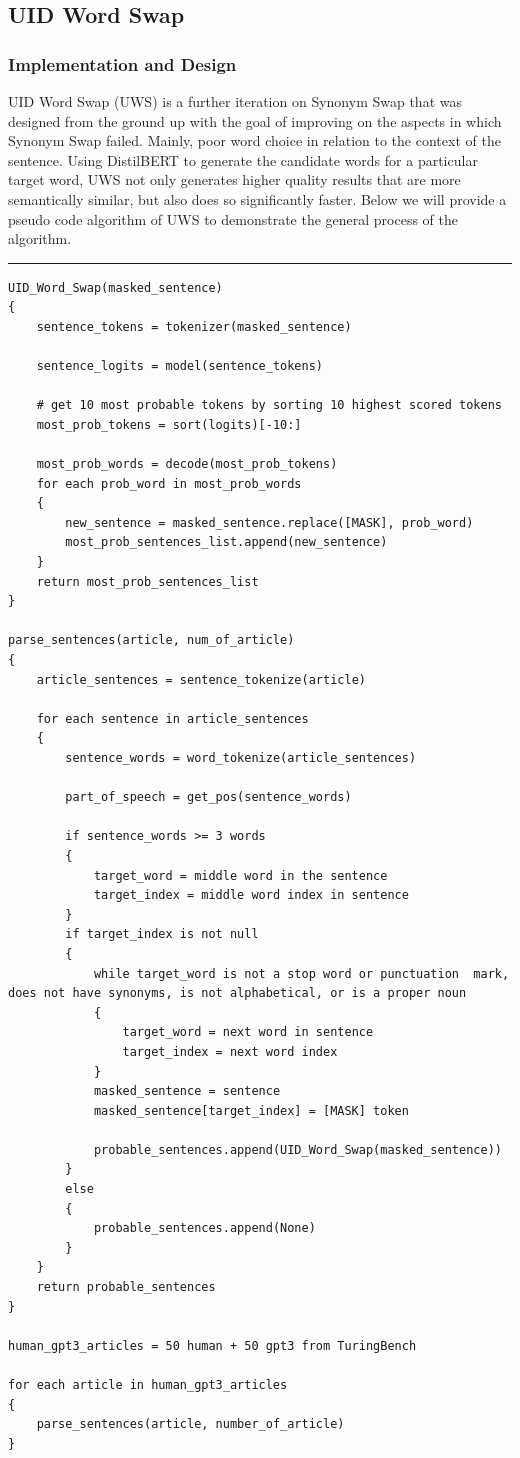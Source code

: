 \documentclass{article}
\begin{document}
\subsection{UID Word Swap}
\subsubsection{Implementation and Design}
UID Word Swap (UWS) is a further iteration on Synonym Swap that was designed from the ground up with the goal of improving on the aspects in which Synonym Swap failed. Mainly, poor word choice in relation to the context of the sentence. Using DistilBERT to generate the candidate words for a particular target word, UWS not only generates higher quality results that are more semantically similar, but also does so significantly faster. Below we will provide a pseudo code algorithm of UWS to demonstrate the general process of the algorithm.
\newline
\noindent\rule{12cm}{0.4pt}
\begin{verbatim}
UID_Word_Swap(masked_sentence)
{
    sentence_tokens = tokenizer(masked_sentence)

    sentence_logits = model(sentence_tokens)

    # get 10 most probable tokens by sorting 10 highest scored tokens
    most_prob_tokens = sort(logits)[-10:]

    most_prob_words = decode(most_prob_tokens)
    for each prob_word in most_prob_words
    {
        new_sentence = masked_sentence.replace([MASK], prob_word)
        most_prob_sentences_list.append(new_sentence)
    }
    return most_prob_sentences_list
}

parse_sentences(article, num_of_article)
{
    article_sentences = sentence_tokenize(article)

    for each sentence in article_sentences
    {
        sentence_words = word_tokenize(article_sentences)

        part_of_speech = get_pos(sentence_words)

        if sentence_words >= 3 words
        {
            target_word = middle word in the sentence
            target_index = middle word index in sentence
        }
        if target_index is not null
        {
            while target_word is not a stop word or punctuation  mark, does not have synonyms, is not alphabetical, or is a proper noun
            {
                target_word = next word in sentence
                target_index = next word index
            }
            masked_sentence = sentence
            masked_sentence[target_index] = [MASK] token

            probable_sentences.append(UID_Word_Swap(masked_sentence))
        }
        else
        {
            probable_sentences.append(None)
        }
    }
    return probable_sentences
}

human_gpt3_articles = 50 human + 50 gpt3 from TuringBench

for each article in human_gpt3_articles
{
    parse_sentences(article, number_of_article)
}
\end{verbatim}
\end{document}
